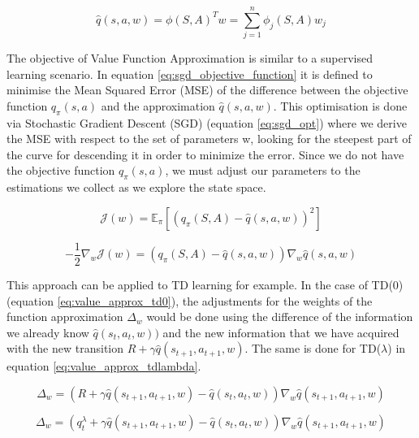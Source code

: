 \begin{equation} \label{eq:comb_qval}
	\hat{q}(s,a,w) = \phi(S,A)^T w = \sum_{j=1}^{n}\phi_{j}(S,A) w_j
\end{equation}

The objective of Value Function Approximation is similar to a supervised learning scenario. In equation \ref{eq:sgd_objective_function} it is defined to minimise the Mean Squared Error (MSE) of the difference between the objective function $q_{\pi}(s,a)$ and the approximation $\hat{q}(s,a,w)$. This optimisation is done via Stochastic Gradient Descent (SGD) (equation \ref{eq:sgd_opt}) where we derive the MSE with respect to the set of parameters w, looking for the steepest part of the curve for descending it in order to minimize the error. Since we do not have the objective function $q_{\pi}(s,a)$, we must adjust our parameters to the estimations we collect as we explore the state space.

\begin{equation} \label{eq:sgd_objective_function}
	\mathcal{J}(w) = \mathbb{E}_{\pi}[(q_{\pi}(S,A) - \hat{q}(s,a,w))^2 ]
\end{equation}

\begin{equation} \label{eq:sgd_opt}
	-\frac{1}{2} \nabla_{w} \mathcal{J}(w) = (q_{\pi}(S,A) - \hat{q}(s,a,w)) \nabla_{w}\hat{q}(s,a,w)
\end{equation}

This approach can be applied to TD learning for example. In the case of TD(0) (equation \ref{eq:value_approx_td0}), the adjustments for the weights of the function approximation $\Delta_{w}$ would be done using the difference of the information we already know $\hat{q}(s_{t},a_{t},w))$ and the new information that we have acquired with the new transition $R + \gamma \hat{q}(s_{t+1},a_{t+1},w)$. The same is done for TD($\lambda$) in equation \ref{eq:value_approx_tdlambda}.

\begin{equation} \label{eq:value_approx_td0}
	\Delta_{w} = (R + \gamma \hat{q}(s_{t+1},a_{t+1},w) - \hat{q}(s_{t},a_{t},w)) \nabla_{w}\hat{q}(s_{t+1},a_{t+1},w)
\end{equation}

\begin{equation} \label{eq:value_approx_tdlambda}
	\Delta_{w} = (q_{t}^{\lambda} + \gamma \hat{q}(s_{t+1},a_{t+1},w) - \hat{q}(s_{t},a_{t},w)) \nabla_{w}\hat{q}(s_{t+1},a_{t+1},w)
\end{equation}

